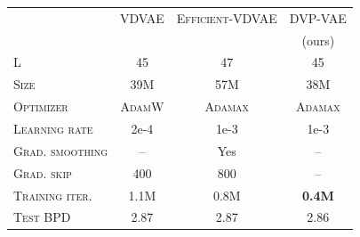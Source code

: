 \begin{table}[t]
    \centering
    \label{tab:ablation_stability}
    \begin{tabular}{l|ccc}
        \toprule
         & \small{\textsc{VDVAE}} & \small{\textsc{Efficient-VDVAE}} &\small{\textsc{DVP-VAE}} \\
         & \footnotesize{\citep{Child2020-ze}} & \footnotesize{\citep{hazami2022efficientvdvae}}&\footnotesize{(ours)}\\
        \midrule
        \textsc{L} & 45 & 47 & 45 \\
        \textsc{Size} & 39M & 57M & 38M \\
        \textsc{Optimizer} & \textsc{AdamW} & \textsc{Adamax} & \textsc{Adamax}\\
        \textsc{Learning rate} & 2e-4 & 1e-3 & 1e-3\\
        \textsc{Grad. smoothing} & -- & Yes & --\\
        \textsc{Grad. skip} & 400 & 800 & --\\
        \textsc{Training iter.} & 1.1M & 0.8M &\textbf{0.4M} \\
        \midrule
        \textsc{Test BPD} & 2.87 & 2.87 &2.86 \\
        \bottomrule
    \end{tabular}
    \vskip 20pt
\end{table}


